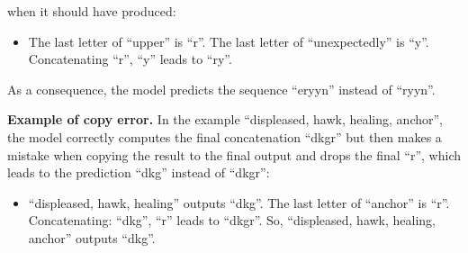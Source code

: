 when it should have produced:

\begin{itemize}
    \item The last letter of ``upper'' is ``r''. The last letter of ``unexpectedly'' is ``y''. Concatenating ``r'', ``y'' leads to ``ry''.
\end{itemize}

As a consequence, the model predicts the sequence ``eryyn'' instead of ``ryyn''.

\textbf{Example of copy error.}
In the example ``displeased, hawk, healing, anchor'', the model correctly computes the final concatenation ``dkgr'' but then makes a mistake when copying the result to the final output and drops the final ``r'', which leads to the prediction ``dkg'' instead of ``dkgr'':

\begin{itemize}
    \item ``displeased, hawk, healing'' outputs ``dkg''. The last letter of ``anchor'' is ``r''. Concatenating: ``dkg'', ``r'' leads to ``dkgr''. So, ``displeased, hawk, healing, anchor'' outputs ``dkg''.
\end{itemize}